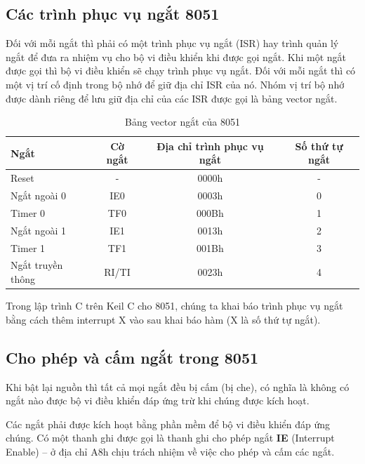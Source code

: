 \documentclass[../report.tex]{subfiles}
\begin{document}
\subsection{Các trình phục vụ ngắt 8051}
Đối với mỗi ngắt thì phải có một trình phục vụ ngắt (ISR) 
hay trình quản lý ngắt để đưa ra nhiệm vụ cho bộ vi điều khiển khi được gọi ngắt. 
Khi một ngắt được gọi thì bộ vi điều khiển sẽ chạy trình phục vụ ngắt. 
Đối với mỗi ngắt thì có một vị trí cố định trong bộ nhớ để giữ địa chỉ ISR của nó. 
Nhóm vị trí bộ nhớ được dành riêng để lưu giữ địa chỉ của các ISR được gọi là bảng vector ngắt.
\begin{table}[H]
\centering
\begin{tabular}{|l|c|c|c|}
\hline 
\textbf{Ngắt} & \textbf{Cờ ngắt} & \textbf{Địa chỉ trình phục vụ ngắt} & \textbf{Số thứ tự ngắt} \\
\hline
Reset & - & 0000h & - \\
\hline
Ngắt ngoài 0 & IE0 & 0003h & 0 \\
\hline
Timer 0 & TF0 & 000Bh & 1 \\
\hline
Ngắt ngoài 1 & IE1 & 0013h & 2 \\
\hline
Timer 1 & TF1 & 001Bh & 3 \\
\hline
Ngắt truyền thông & RI/TI & 0023h & 4 \\
\hline
\end{tabular}
\caption{Bảng vector ngắt của 8051}
\end{table}

Trong lập trình C trên Keil C cho 8051, chúng ta khai báo trình phục vụ ngắt bằng cách thêm interrupt X 
vào sau khai báo hàm (X là số thứ tự ngắt). 

\subsection{Cho phép và cấm ngắt trong 8051}
Khi bật lại nguồn thì tất cả mọi ngắt đều bị cấm (bị che), 
có nghĩa là không có ngắt nào được bộ vi điều khiển đáp ứng trừ khi chúng được kích hoạt.

Các ngắt phải được kích hoạt bằng phần mềm để bộ vi điều khiển đáp ứng chúng. 
Có một thanh ghi được gọi là thanh ghi cho phép ngắt \textbf{IE} (Interrupt Enable) – 
ở địa chỉ A8h chịu trách nhiệm về việc cho phép và cấm các ngắt.
\end{document}
